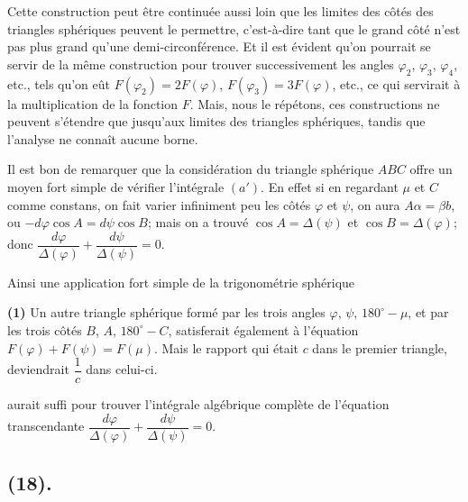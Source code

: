 \documentclass{article}
\begin{document}
Cette construction peut être continuée aussi loin que les limites des côtés des triangles sphériques peuvent le permettre, c'est-à-dire tant que le grand côté n'est pas plus grand qu'une demi-circonférence. Et il est évident qu'on pourrait se servir de la même construction pour trouver successivement les angles $\varphi_{2}$, $\varphi_{3}$, $\varphi_{4}$, etc., tels qu'on eût $F(\varphi_{2})=2F(\varphi)$, $F(\varphi_{3})=3F(\varphi)$, etc., ce qui servirait à la multiplication de la fonction $F$. Mais, nous le répétons, ces constructions ne peuvent s'étendre que jusqu'aux limites des triangles sphériques, tandis que l'analyse ne connaît aucune borne.

Il est bon de remarquer que la considération du triangle sphérique $ABC$ offre un moyen fort simple de vérifier l'intégrale $(a')$. En effet si en regardant $\mu$ et $C$ comme constans, on fait varier infiniment peu les côtés $\varphi$ et $\psi$, on aura $A\alpha=\beta b$, ou $-d\varphi\cos A=d\psi\cos B$; mais on a trouvé $\cos A=\Delta(\psi)$ et $\cos B=\Delta(\varphi)$; donc $\dfrac{d\varphi}{\Delta(\varphi)}+\dfrac{d\psi}{\Delta(\psi)}=0$.

Ainsi une application fort simple de la trigonométrie sphérique

\textbf{(1)} Un autre triangle sphérique formé par les trois angles $\varphi$, $\psi$, $180^{\circ}-\mu$, et par les trois côtés $B$, $A$, $180^{\circ}-C$, satisferait également à l'équation $F(\varphi)+F(\psi)=F(\mu)$. Mais le rapport qui était $c$ dans le premier triangle, deviendrait $\dfrac{1}{c}$ dans celui-ci.

aurait suffi pour trouver l'intégrale algébrique complète de l'équation transcendante $\dfrac{d\varphi}{\Delta(\varphi)}+\dfrac{d\psi}{\Delta(\psi)}=0$.

\subsection*{(18).}
\end{document}
